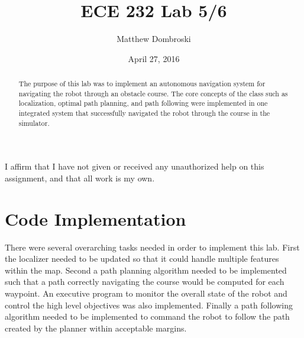 \documentclass[letterpaper,12pt]{article}
\begin{document}
\title{ECE 232 Lab 5/6}
\author{Matthew Dombroski}
\date{April 27, 2016}
\maketitle


 I affirm that I have not given or received any unauthorized help on this assignment,
and that all work is my own.
\begin{abstract}
The purpose of this lab was to implement an autonomous navigation system for navigating the robot through an obstacle course. The core concepts of the class such as localization, optimal path planning, and path following were implemented in one integrated system that successfully navigated the robot through the course in the simulator. 
\end{abstract}


\section{Code Implementation}
There were several overarching tasks needed in order to implement this lab. First the localizer needed to be updated so that it could handle multiple features within the map. Second a path planning algorithm needed to be implemented such that a path correctly navigating the course would be computed for each waypoint. An executive program to monitor the overall state of the robot and control the high level objectives was also implemented. Finally a path following algorithm needed to be implemented to command the robot to follow the path created by the planner within acceptable margins.
\end{document}

